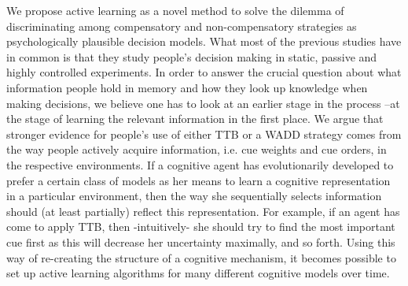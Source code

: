 \documentclass[10pt,letterpaper]{article}
\begin{document}
We propose active learning as a novel method to solve the dilemma of discriminating among compensatory and non-compensatory strategies as psychologically plausible decision models. What most of the previous studies have in common is that they study people’s decision making in static, passive and highly controlled experiments. In order to answer the crucial question about what information people hold in memory and how they look up knowledge when making decisions, we believe one has to look at an earlier stage in the process --at the stage of learning the relevant information in the first place. We argue that stronger evidence for people’s use of either TTB or a WADD strategy comes from the way people actively acquire information, i.e. cue weights and cue orders, in the respective environments. If a cognitive agent has  evolutionarily developed to prefer a certain class of models as her means to learn a cognitive representation in a particular environment, then the way she sequentially selects information should (at least partially) reflect this representation. For example, if an agent has come to apply TTB, then -intuitively- she should try to find the most important cue first as this will decrease her uncertainty maximally, and so forth. Using this way of re-creating the structure of a cognitive mechanism, it becomes possible to set up active learning algorithms for many different cognitive models over time. 
\end{document}
